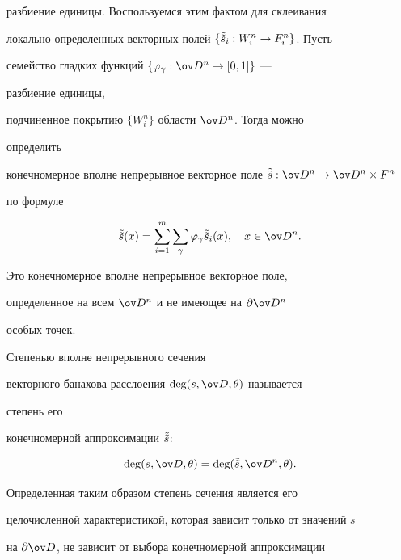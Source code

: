 разбиение единицы. Воспользуемся этим фактом для склеивания 


локально определенных векторных полей $\{\Tilde{\Tilde s}_i:W^n_i\to 


F^n_i\}$. Пусть 


семейство гладких функций $\{\varphi_\gamma:\ov D{}^n\to[0,1]\}$ --- 


разбиение единицы, 


подчиненное покрытию $\{W^n_i\}$ области $\ov D{}^n$. Тогда можно 


определить 


конечномерное вполне непрерывное векторное поле $\Tilde{\Tilde s}:\ov 


D{}^n\to\ov D{}^n\times F^n$ 


по формуле 


$$ 


\Tilde{\Tilde s}(x)=\sum^m_{i=1}\sum_\gamma 


\varphi_\gamma\Tilde{\Tilde s}_i(x),\quad x\in\ov D{}^n. 


$$ 


Это конечномерное вполне непрерывное векторное поле, 


определенное на всем $\ov D{}^n$ и не имеющее на $\partial\ov D{}^n$ 


особых точек. 


 


\begin{defn} 


Степенью вполне непрерывного сечения 


векторного банахова расслоения $\deg(s,\ov D,\theta)$ называется 


степень его 


конечномерной аппроксимации $\Tilde{\Tilde s}$: 


$$ 


\deg(s,\ov D,\theta)=\deg(\Tilde{\Tilde s},\ov D{}^n,\theta). 


$$ 


\end{defn} 


 


 


Определенная таким образом степень сечения является его 


целочисленной характеристикой, которая зависит только от значений $s$ 


на $\partial\ov D$, не зависит от выбора конечномерной аппроксимации 


